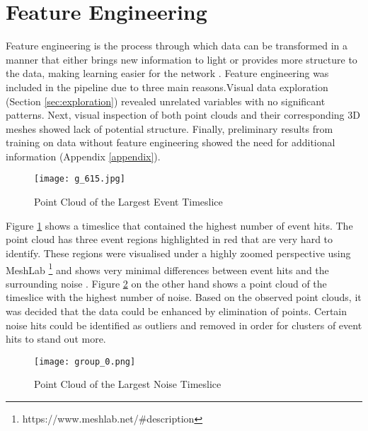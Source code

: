 \section{Feature Engineering}
Feature engineering is the process through which data can be transformed in a manner that either brings new information to light or provides more structure to the data, making learning easier for the network \cite{guyon2003introduction}. Feature engineering was included in the pipeline due to three main reasons.Visual data exploration (Section \ref{sec:exploration}) revealed unrelated variables with no significant patterns. Next, visual inspection of both point clouds and their corresponding 3D meshes showed lack of potential structure. Finally, preliminary results from training on data without feature engineering showed the need for additional information (Appendix \ref{appendix}).

\begin{figure}[ht!]
    \centering 
    \texttt{[image: g\_615.jpg]}
    \caption{Point Cloud of the Largest Event Timeslice}
    \label{fig:g_615}
\end{figure}


Figure \ref{fig:g_615} shows a timeslice that contained the highest number of event hits. The point cloud has three event regions highlighted in red that are very hard to identify. These regions were visualised under a highly zoomed perspective using MeshLab \footnote{https://www.meshlab.net/\#description} and shows very minimal differences between event hits and the surrounding noise \cite{LocalChapterEvents:ItalChap:ItalianChapConf2008:129-136}. Figure \ref{fig:g_0} on the other hand shows a point cloud of the timeslice with the highest number of noise. Based on the observed point clouds, it was decided that the data could be enhanced by elimination of points. Certain noise hits could be identified as outliers and removed in order for clusters of event hits to stand out more. 

\begin{figure}[ht!]
    \centering 
    \texttt{[image: group\_0.png]}
    \caption{Point Cloud of the Largest Noise Timeslice}
    \label{fig:g_0}
\end{figure}

